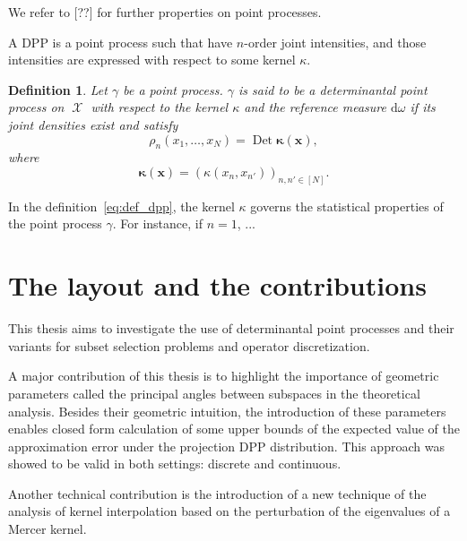 \documentclass[twoside,11pt]{book}
\newtheorem{definition}{Definition}
\numberwithin{theorem}{chapter}
\numberwithin{definition}{chapter}
\numberwithin{proposition}{chapter}
\numberwithin{corollary}{chapter}
\numberwithin{example}{chapter}
\numberwithin{lemma}{chapter}
\DeclareMathOperator{\Det}{Det}
\DeclareMathOperator{\X}{\mathcal{X}}
\begin{document}
We refer to [??] for further properties on point processes.


A DPP is a point process such that have $n$-order joint intensities, and those intensities are expressed with respect to some kernel $\kappa$.
\begin{definition}\label{eq:def_dpp}
Let $\gamma$ be a point process. $\gamma$ is said to be a determinantal point process on $\X$ with respect to the kernel $\kappa$ and the reference measure $\mathrm{d}\omega$ if its joint densities exist and satisfy
\begin{equation}
\rho_{n}(x_{1}, \dots, x_{N}) = \Det \bm{\kappa}(\bm{x}),
\end{equation}
where
\begin{equation}
\bm{\kappa}(\bm{x}) = (\kappa(x_{n},x_{n'}))_{n,n' \in [N]}.
\end{equation}
\end{definition}

In the definition~\eqref{eq:def_dpp}, the kernel $\kappa$ governs the statistical properties of the point process $\gamma$. For instance, if $n =1$, ...


\clearpage



\section{The layout and the contributions}
This thesis aims to investigate the use of determinantal point processes and their variants for subset selection problems and operator discretization. 

A major contribution of this thesis is to highlight the importance of geometric parameters called the principal angles between subspaces in the theoretical analysis. Besides their geometric intuition, the introduction of these parameters enables closed form calculation of some upper bounds of the expected value of the approximation error under the projection DPP distribution. This approach was showed to be valid in both settings: discrete and continuous.

Another technical contribution is the introduction of a new technique of the analysis of kernel interpolation based on the perturbation of the eigenvalues of a Mercer kernel.
\end{document}
